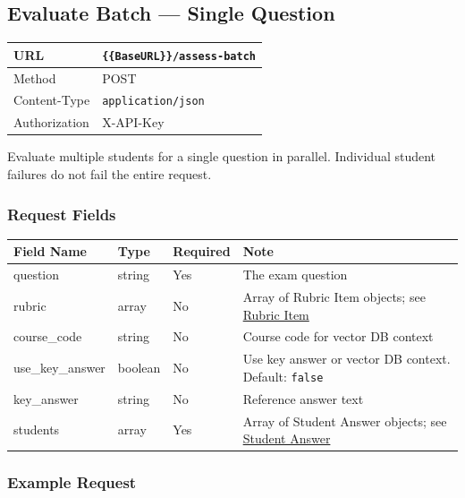 \documentclass[11pt]{article}
\begin{document}
\subsection{Evaluate Batch — Single Question}

\begin{tabular}{|H{3cm}|p{12.1cm}|}
  \hline
  URL           & \texttt{\{\{BaseURL\}\}/assess-batch} \\
  \hline
  Method        & POST \\
  \hline
  Content-Type  & \texttt{application/json} \\
  \hline
  Authorization & X-API-Key \\
  \hline
\end{tabular}

Evaluate multiple students for a single question in parallel. Individual
student failures do not fail the entire request.

\subsubsection{Request Fields}

\begin{longtable}{|p{3.5cm}|p{2cm}|p{2cm}|p{6.8cm}|}
  \hline
  \rowcolor{tabheader}
  \textbf{Field Name} & \textbf{Type} & \textbf{Required} & \textbf{Note} \\
  \hline
  \endhead
  question         & string  & Yes & The exam question \\
  \hline
  rubric           & array   & No  & Array of Rubric Item objects; see \hyperref[sec:rubricitem]{Rubric Item} \\
  \hline
  course\_code     & string  & No  & Course code for vector DB context \\
  \hline
  use\_key\_answer & boolean & No  & Use key answer or vector DB context. Default: \texttt{false} \\
  \hline
  key\_answer      & string  & No  & Reference answer text \\
  \hline
  students         & array   & Yes & Array of Student Answer objects; see \hyperref[sec:studentanswer]{Student Answer} \\
  \hline
\end{longtable}

\subsubsection{Example Request}
\end{document}
